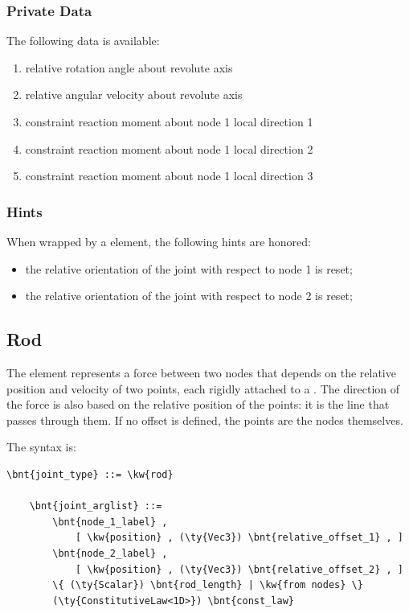 \subsubsection{Private Data}
The following data is available:
\begin{enumerate}
\item {} relative rotation angle about revolute axis
\item {} relative angular velocity about revolute axis
\item {} constraint reaction moment about node 1 local direction 1
\item {} constraint reaction moment about node 1 local direction 2
\item {} constraint reaction moment about node 1 local direction 3
\end{enumerate}

\subsubsection{Hints}
When wrapped by a  element, the following hints are honored:
\begin{itemize}
\item {} the relative orientation of the joint
with respect to node 1 is reset;
\item {} the relative orientation of the joint
with respect to node 2 is reset;
\end{itemize}





\subsection{Rod}\label{sec:EL:STRUCT:JOINT:ROD}
The  element represents a force between two nodes that depends
on the relative position and velocity of two points, each rigidly attached
to a .
The direction of the force is also based on the relative position
of the points: it is the line that passes through them.
If no offset is defined, the points are the nodes themselves.

The syntax is:
\begin{Verbatim}[commandchars=\\\{\}]
    \bnt{joint_type} ::= \kw{rod}

    \bnt{joint_arglist} ::=
        \bnt{node_1_label} ,
            [ \kw{position} , (\ty{Vec3}) \bnt{relative_offset_1} , ]
        \bnt{node_2_label} , 
            [ \kw{position} , (\ty{Vec3}) \bnt{relative_offset_2} , ]
        \{ (\ty{Scalar}) \bnt{rod_length} | \kw{from nodes} \}
        (\ty{ConstitutiveLaw<1D>}) \bnt{const_law}
\end{Verbatim}

